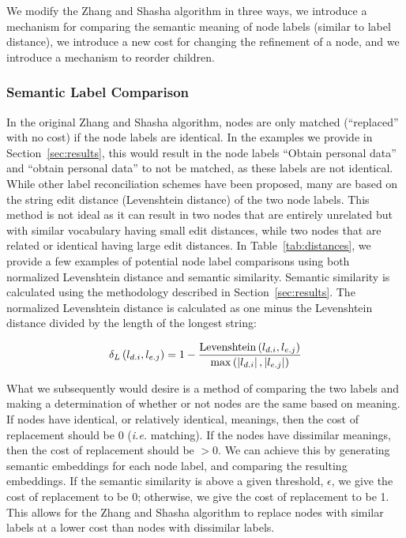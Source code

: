 We modify the Zhang and Shasha algorithm in three ways, we introduce a mechanism for comparing the semantic meaning of node labels (similar to label distance), we introduce a new cost for changing the refinement of a node, and we introduce a mechanism to reorder children.

\subsubsection{Semantic Label Comparison}


In the original Zhang and Shasha algorithm, nodes are only matched (``replaced'' with no cost) if the node labels are identical. In the examples we provide in Section~\ref{sec:results}, this would result in the node labels ``Obtain personal data'' and ``obtain personal data'' to not be matched, as these labels are not identical. While other label reconciliation schemes have been proposed, many are based on the string edit distance (Levenshtein distance) of the two node labels. This method is not ideal as it can result in two nodes that are entirely unrelated but with similar vocabulary having small edit distances, while two nodes that are related or identical having large edit distances. In Table~\ref{tab:distances}, we provide a few examples of potential node label comparisons using both normalized Levenshtein distance and semantic similarity. Semantic similarity is calculated using the methodology described in Section~\ref{sec:results}. The normalized Levenshtein distance is calculated as one minus the Levenshtein distance divided by the length of the longest string:

\[
    \delta_L\left(l_{{d}.{i}}, l_{{e}.{j}}\right) = 1 - \frac{\text{Levenshtein}\left(l_{{d}.{i}}, l_{{e}.{j}}\right)}{\max\left(\left|l_{{d}.{i}}\right|, \left|l_{{e}.{j}}\right|\right)}
\]




What we subsequently would desire is a method of comparing the two labels and making a determination of whether or not nodes are the same based on meaning. If nodes have identical, or relatively identical, meanings, then the cost of replacement should be 0 (\textit{i.e.} matching). If the nodes have dissimilar meanings, then the cost of replacement should be $>0$. We can achieve this by generating semantic embeddings for each node label, and comparing the resulting embeddings. If the semantic similarity is above a given threshold, $\epsilon$, we give the cost of replacement to be 0; otherwise, we give the cost of replacement to be 1. This allows for the Zhang and Shasha algorithm to replace nodes with similar labels at a lower cost than nodes with dissimilar labels.

